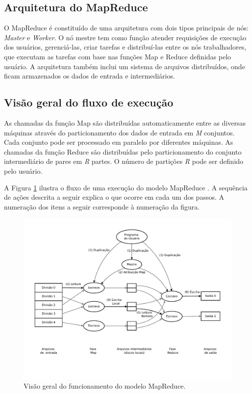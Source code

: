 \subsection{Arquitetura do MapReduce}
O MapReduce é constituído de uma arquitetura com dois tipos principais de nós: \textit{Master} e \textit{Worker}. O nó mestre tem como função atender requisições de execução dos usuários, gerenciá-las, criar tarefas e distribuí-las entre os nós trabalhadores, que executam as tarefas com base nas funções Map e Reduce definidas pelo usuário.
A arquitetura também inclui um sistema de arquivos distribuídos, onde ficam armazenados os dados de entrada e intermediários.



\subsection{Visão geral do fluxo de execução}


As chamadas da função Map são distribuídas automaticamente entre as diversas máquinas através do particionamento dos dados de entrada em \textit{M} conjuntos. Cada conjunto pode ser processado em paralelo por diferentes máquinas. As chamadas da função Reduce são distribuídas pelo particionamento do conjunto intermediário de pares em \textit{R} partes. O número de partições \textit{R} pode ser definido pelo usuário.

A Figura \ref{fig:MapReduceoverview} ilustra o fluxo de uma execução do modelo MapReduce \cite{Dean:2008}. A sequência de ações descrita a seguir explica o que ocorre em cada um dos passos. A numeração dos itens a seguir corresponde à numeração da figura.

 \begin{figure}[!htb]
 \centering
\includegraphics[trim=0cm 2cm 0cm 1cm, width=\textwidth]{figuras/MapReduceOverflow.pdf}
\caption{Visão geral do funcionamento do modelo MapReduce.}
\label{fig:MapReduceoverview}
\end{figure}

